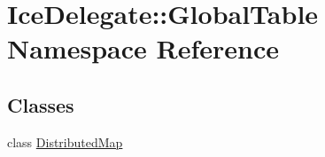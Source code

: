 \hypertarget{namespace_ice_delegate_1_1_global_table}{
\section{IceDelegate::GlobalTable Namespace Reference}
\label{namespace_ice_delegate_1_1_global_table}
}
\subsection*{Classes}
\begin{DoxyCompactItemize}
\item 
class \hyperlink{class_ice_delegate_1_1_global_table_1_1_distributed_map}{DistributedMap}
\end{DoxyCompactItemize}

